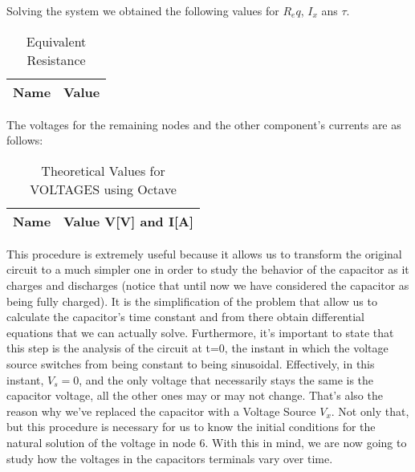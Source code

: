 Solving the system we obtained the following values for $R_eq$, $I_x$ ans $\tau$.

\begin{table}[H]
  \centering
  \begin{tabular}{|l|r|}
    \hline
    {\bf Name} & {\bf Value} \\ \hline
    
  \end{tabular}
  \caption{Equivalent Resistance}
  \label{tab:R_eq}
\end{table}

The voltages for the remaining nodes and the other component's currents are as follows:

\begin{table}[H]
  \centering
  \begin{tabular}{|l|r|}
    \hline
    {\bf Name} & {\bf Value V[V] and I[A]} \\ \hline
    
  \end{tabular}
  \caption{Theoretical Values for VOLTAGES using Octave}
  \label{tab:alinea2_voltagens_tab}
\end{table}

This procedure is extremely useful because it allows us to transform the original circuit to a much simpler one in order to study the behavior of the capacitor as it charges and discharges (notice that until now we have considered the capacitor as being fully charged). It is the simplification of the problem that allow us to calculate the capacitor's time constant and from there obtain differential equations that we can actually solve.
Furthermore, it's important to state that this step is the analysis of the circuit at t=0, the instant in which the voltage source switches from being constant to being sinusoidal. Effectively, in this instant, $V_{s}=0$, and the only voltage that necessarily stays the same is the capacitor voltage, all the other ones may or may not change. That's also the reason why we've replaced the capacitor with a Voltage Source $V_{x}$. Not only that, but
this procedure is necessary for us to know the initial conditions for the natural solution of the voltage in node 6.
With this in mind, we are now going to study how the voltages in the capacitors terminals vary over time.



